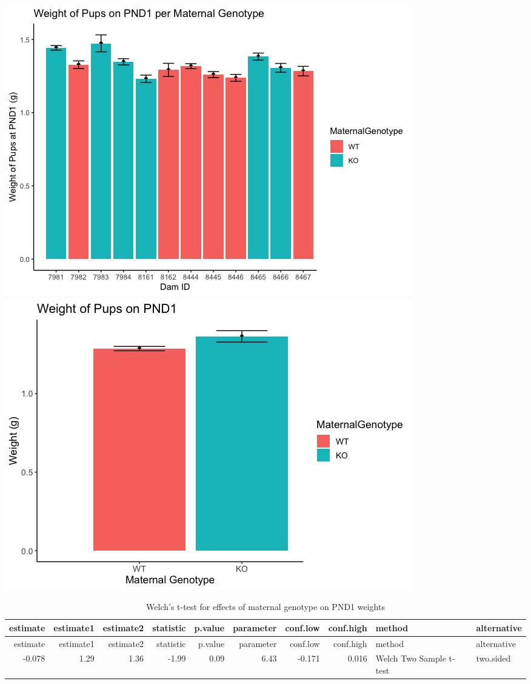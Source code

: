 \documentclass[]{article}
\begin{document}
\includegraphics{figures/PUPweight_graphsPND1-1.png}
\includegraphics{figures/PUPweight_graphsPND1-2.png}

\begin{longtable}[]{@{}rrrrrrrrll@{}}
\caption{Welch's t-test for effects of maternal genotype on PND1
weights}\tabularnewline
\toprule
estimate & estimate1 & estimate2 & statistic & p.value & parameter &
conf.low & conf.high & method & alternative\tabularnewline
\midrule
\endfirsthead
\toprule
estimate & estimate1 & estimate2 & statistic & p.value & parameter &
conf.low & conf.high & method & alternative\tabularnewline
\midrule
\endhead
-0.078 & 1.29 & 1.36 & -1.99 & 0.09 & 6.43 & -0.171 & 0.016 & Welch Two
Sample t-test & two.sided\tabularnewline
\bottomrule
\end{longtable}
\end{document}
